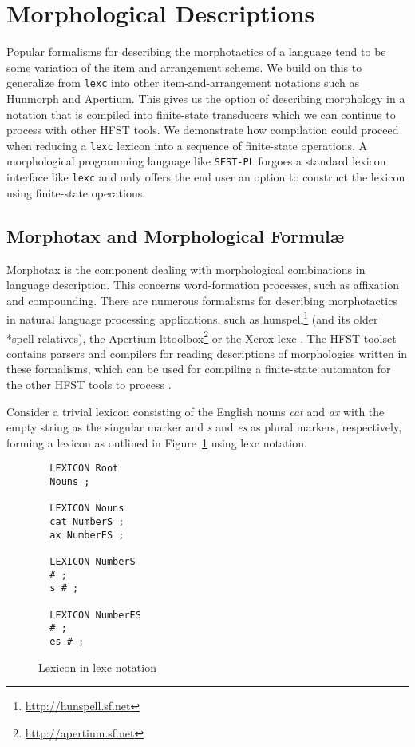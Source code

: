 \documentclass{llncs}
\begin{document}
\section{Morphological Descriptions}\label{MorphTools}


Popular formalisms for describing the morphotactics of a language tend to be some variation 
of the item and arrangement scheme. We build on this to generalize from \verb!lexc! into other
item-and-arrangement notations such as Hunmorph and Apertium. This gives us the option of describing
morphology in a notation that is compiled into finite-state transducers which we can continue to process with other
HFST tools. We demonstrate how compilation could proceed when reducing a \verb!lexc! lexicon into a sequence of
finite-state operations. A morphological programming language like \verb!SFST-PL! forgoes a standard lexicon interface
like \verb!lexc! and only offers the end user an option to construct the lexicon using finite-state operations. 

\subsection{Morphotax and Morphological Formul\ae}

Morphotax is the component dealing with morphological combinations in language
description. This concerns word-formation processes, such as affixation and
compounding.  There are numerous formalisms for describing morphotactics in natural
language processing applications, such as
hunspell\footnote{\url{http://hunspell.sf.net}} (and its older *spell
relatives), the Apertium lttoolbox\footnote{\url{http://apertium.sf.net}} or
the Xerox lexc \cite{beesley/2003}. The HFST toolset contains parsers and
compilers for reading descriptions of morphologies written in these formalisms,
which can be used for compiling a finite-state automaton for the other HFST
tools to process \cite{pirinen/2010/il,linden/2009/sfcm}.

Consider a trivial lexicon consisting of the English nouns \emph{cat} and
\emph{ax} with the empty string as the singular marker and \emph{s} and
\emph{es} as plural markers, respectively,  forming a lexicon as outlined in
Figure~\ref{fig:morph0} using lexc notation.

\begin{figure} [h]
{\footnotesize
\begin{verbatim}
  LEXICON Root
  Nouns ;

  LEXICON Nouns
  cat NumberS ;
  ax NumberES ;

  LEXICON NumberS
  # ;
  s # ;

  LEXICON NumberES
  # ;
  es # ;
\end{verbatim}
}
\caption{Lexicon in lexc notation}
\label{fig:morph0}
\end{figure}
\end{document}
